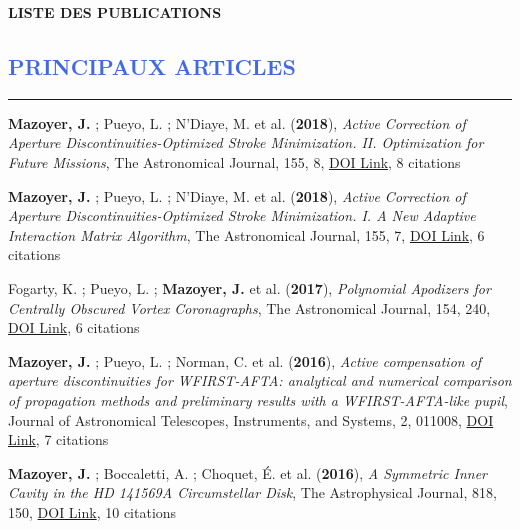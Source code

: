 \documentclass[11pt, a4paper, french]{article}
\begin{document}
\begin{center}\begin{Large}
\textbf{LISTE DES PUBLICATIONS}
\end{Large}\end{center}

\setcounter{section}{0}



\vspace{-0.5cm}
\textcolor{RoyalBlue}{\section{PRINCIPAUX ARTICLES}
\vspace{-0.25cm}\hrule}
\vspace{0.6cm}

\begin{etaremune} \itemsep 0pt

\item {\bf Mazoyer, J.} ; Pueyo, L. ; N'Diaye, M. et al. ({\bf2018}), {\it Active Correction of Aperture Discontinuities-Optimized Stroke Minimization. II. Optimization for Future Missions}, The Astronomical Journal, 155, 8, \href{https://doi.org/10.3847/1538-3881/aa91d7}{DOI Link}, 8 citations

 \item {\bf Mazoyer, J.} ; Pueyo, L. ; N'Diaye, M. et al. ({\bf2018}), {\it Active Correction of Aperture Discontinuities-Optimized Stroke Minimization. I. A New Adaptive Interaction Matrix Algorithm}, The Astronomical Journal, 155, 7, \href{https://doi.org/10.3847/1538-3881/aa91cf}{DOI Link}, 6 citations

 \item Fogarty, K. ; Pueyo, L. ; {\bf Mazoyer, J.} et al. ({\bf2017}), {\it Polynomial Apodizers for Centrally Obscured Vortex Coronagraphs}, The Astronomical Journal, 154, 240, \href{https://doi.org/10.3847/1538-3881/aa9063}{DOI Link}, 6 citations

 \item {\bf Mazoyer, J.} ; Pueyo, L. ; Norman, C. et al. ({\bf2016}), {\it Active compensation of aperture discontinuities for WFIRST-AFTA: analytical and numerical comparison of propagation methods and preliminary results with a WFIRST-AFTA-like pupil}, Journal of Astronomical Telescopes, Instruments, and Systems, 2, 011008, \href{https://doi.org/10.1117/1.JATIS.2.1.011008}{DOI Link}, 7 citations

 \item {\bf Mazoyer, J.} ; Boccaletti, A. ; Choquet, {\'E}. et al. ({\bf2016}), {\it A Symmetric Inner Cavity in the HD 141569A Circumstellar Disk}, The Astrophysical Journal, 818, 150, \href{https://doi.org/10.3847/0004-637X/818/2/150}{DOI Link}, 10 citations


\end{etaremune}
\end{document}
